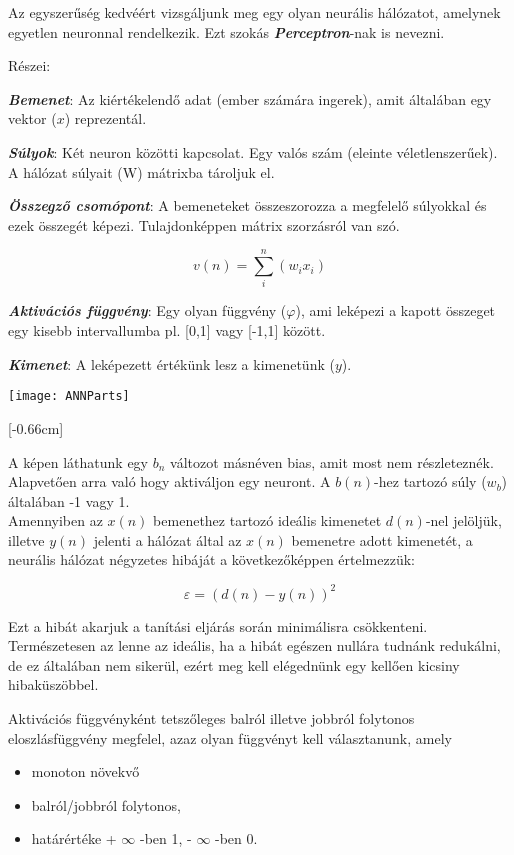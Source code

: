 Az egyszerűség kedvéért vizsgáljunk meg egy olyan neurális hálózatot, amelynek egyetlen neuronnal rendelkezik. Ezt szokás \textbf{\textit{Perceptron}}-nak is nevezni. 

Részei: 

\textbf{\textit{Bemenet}}: Az kiértékelendő adat (ember számára ingerek), amit általában egy vektor (\(x\)) reprezentál. 

\textit{\textbf{Súlyok}}: Két neuron közötti kapcsolat. Egy valós szám (eleinte véletlenszerűek). A hálózat súlyait (W) mátrixba tároljuk el.  

\textbf{\textit{Összegző csomópont}}: A bemeneteket összeszorozza a megfelelő súlyokkal és ezek összegét képezi. Tulajdonképpen mátrix szorzásról van szó.  

\[v(n) = \sum_i^{n}(w_ix_i)\]

\textit{\textbf{Aktivációs függvény}}: Egy olyan függvény ($\varphi$), ami leképezi a kapott összeget egy kisebb intervallumba pl. [0,1] vagy [-1,1] között. 

\textbf{\textit{Kimenet}}: A leképezett értékünk lesz a kimenetünk (\(y\)). 

\begin{center}
	\texttt{[image: ANNParts]}
\end{center}

[-0.66cm]

A képen láthatunk egy \(b_n\) változot másnéven bias, amit most nem részleteznék. Alapvetően arra való hogy aktiváljon egy neuront. A \(b(n)\)-hez tartozó súly (\(w_b\)) általában -1 vagy 1.\\

Amennyiben az \(x(n)\) bemenethez tartozó ideális kimenetet \(d(n)\)-nel jelöljük, illetve \(y(n)\) jelenti a hálózat által az \(x(n)\) bemenetre adott kimenetét, a neurális hálózat négyzetes hibáját a következőképpen értelmezzük: 

\[ \varepsilon = (d(n) - y(n))^2\]

Ezt a hibát akarjuk a tanítási eljárás során minimálisra csökkenteni. Természetesen az lenne az ideális, ha a hibát egészen nullára tudnánk redukálni, de ez általában nem sikerül, ezért meg kell elégednünk egy kellően kicsiny hibaküszöbbel.

Aktivációs függvényként tetszőleges balról illetve jobbról folytonos eloszlásfüggvény megfelel, azaz olyan függvényt kell választanunk, amely

\begin{itemize}
\item monoton növekvő
\item balról/jobbról folytonos,
\item határértéke + $\infty$ -ben 1, - $\infty$ -ben 0.
\end{itemize}

